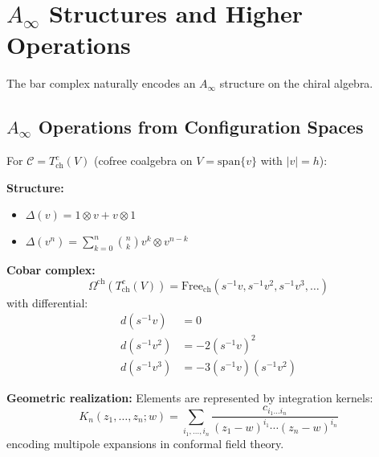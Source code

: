 \section{$A_\infty$ Structures and Higher Operations}



The bar complex naturally encodes an $A_\infty$ structure on the chiral algebra.

\subsection{$A_\infty$ Operations from Configuration Spaces}

\begin{example}
For $\mathcal{C} = T^c_{\text{ch}}(V)$ (cofree coalgebra on $V = \text{span}\{v\}$ with $|v| = h$):

\textbf{Structure:}
\begin{itemize}
\item $\Delta(v) = 1 \otimes v + v \otimes 1$
\item $\Delta(v^n) = \sum_{k=0}^n \binom{n}{k} v^k \otimes v^{n-k}$
\end{itemize}

\textbf{Cobar complex:}
\[
\Omega^{\text{ch}}(T^c_{\text{ch}}(V)) = \text{Free}_{\text{ch}}(s^{-1}v, s^{-1}v^2, s^{-1}v^3, \ldots)
\]
with differential:
\begin{align}
d(s^{-1}v) &= 0 \\
d(s^{-1}v^2) &= -2(s^{-1}v)^2 \\
d(s^{-1}v^3) &= -3(s^{-1}v)(s^{-1}v^2)
\end{align}

\textbf{Geometric realization:}
Elements are represented by integration kernels:
\[
K_n(z_1, \ldots, z_n; w) = \sum_{i_1, \ldots, i_n} \frac{c_{i_1\ldots i_n}}{(z_1 - w)^{i_1} \cdots (z_n - w)^{i_n}}
\]
encoding multipole expansions in conformal field theory.
\end{example}

